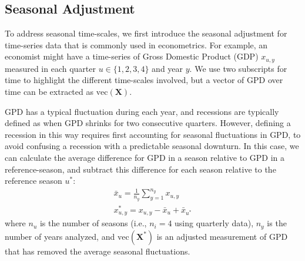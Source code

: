 \subsection{Seasonal Adjustment}

To address seasonal time-scales, we first introduce the seasonal adjustment for time-series data that is commonly used in econometrics.  For example, an economist might have a time-series of Gross Domestic Product (GDP) \(x_{u,y}\) measured in each quarter \( u \in \{1,2,3,4\} \) and year \(y\).  We use two subscripts for time to highlight the different time-scales involved, but a vector of GPD over time can be extracted as \( \mathrm{vec}(\mathbf X) \).  

GPD has a typical fluctuation during each year, and recessions are typically defined as when GPD shrinks for two consecutive quarters.  However, defining a recession in this way requires first accounting for seasonal fluctuations in GPD, to avoid confusing a recession with a predictable seasonal downturn.  In this case, we can calculate the average difference for GPD in a season relative to GPD in a reference-season, and subtract this difference for each season relative to the reference season \( u^* \):
\begin{equation} \label{eq:Chap8_seasonal_adjustment}
\begin{gathered}
    \bar x_u = \frac{1}{n_y} \sum_{y=1}^{n_y} x_{u,y} \\
    x^*_{u,y} = x_{u,y} - \bar x_u + \bar x_{u^*}
\end{gathered}
\end{equation}
where \(n_u\) is the number of seasons (i.e., \(n_i=4\) using quarterly data), \(n_y\) is the number of years analyzed, and \( \mathrm {vec}(\mathbf X^*) \) is an adjusted measurement of GPD that has removed the average seasonal fluctuations.

